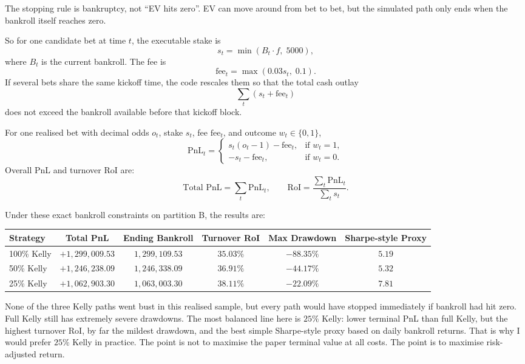 \documentclass{article}
\begin{document}
The stopping rule is bankruptcy, not ``EV hits zero''. EV can move around from bet to bet, but the simulated path only ends when the bankroll itself reaches zero.

So for one candidate bet at time \(t\), the executable stake is
\[
s_t=\min(B_t\cdot f,\; 5000),
\]
where \(B_t\) is the current bankroll. The fee is
\[
\text{fee}_t=\max(0.03s_t,\;0.1).
\]
If several bets share the same kickoff time, the code rescales them so that the total cash outlay
\[
\sum_t (s_t+\text{fee}_t)
\]
does not exceed the bankroll available before that kickoff block.

For one realised bet with decimal odds \(o_t\), stake \(s_t\), fee \(\text{fee}_t\), and outcome \(w_t\in\{0,1\}\),
\[
\text{PnL}_t=
\begin{cases}
s_t(o_t-1)-\text{fee}_t, & \text{if } w_t=1,\\
-s_t-\text{fee}_t, & \text{if } w_t=0.
\end{cases}
\]
Overall PnL and turnover RoI are:
\[
\text{Total PnL}=\sum_t \text{PnL}_t,
\qquad
\text{RoI}=\frac{\sum_t \text{PnL}_t}{\sum_t s_t}.
\]

Under these exact bankroll constraints on partition B, the results are:
\begin{center}
\begin{tabular}{lccccc}
\toprule
Strategy & Total PnL & Ending Bankroll & Turnover RoI & Max Drawdown & Sharpe-style Proxy \\
\midrule
100\% Kelly & \(+1{,}299{,}009.53\) & \(1{,}299{,}109.53\) & \(35.03\%\) & \(-88.35\%\) & \(5.19\) \\
50\% Kelly & \(+1{,}246{,}238.09\) & \(1{,}246{,}338.09\) & \(36.91\%\) & \(-44.17\%\) & \(5.32\) \\
25\% Kelly & \(+1{,}062{,}903.30\) & \(1{,}063{,}003.30\) & \(38.11\%\) & \(-22.09\%\) & \(7.81\) \\
\bottomrule
\end{tabular}
\end{center}

None of the three Kelly paths went bust in this realised sample, but every path would have stopped immediately if bankroll had hit zero. Full Kelly still has extremely severe drawdowns. The most balanced line here is \(25\%\) Kelly: lower terminal PnL than full Kelly, but the highest turnover RoI, by far the mildest drawdown, and the best simple Sharpe-style proxy based on daily bankroll returns. That is why I would prefer \(25\%\) Kelly in practice. The point is not to maximise the paper terminal value at all costs. The point is to maximise risk-adjusted return.
\end{document}
